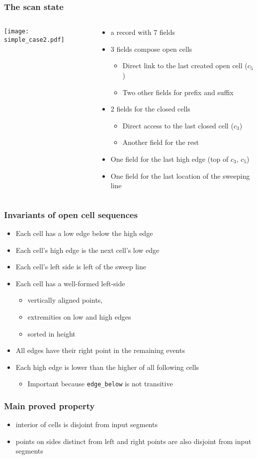 \documentclass[compress]{beamer}
\begin{document}
\begin{frame}[fragile]
\frametitle{The scan state}
\begin{columns}
\begin{column}{0.2\textwidth}
{\texttt{[image: simple\_case2.pdf]}}
\end{column}
\begin{column}{0.8\textwidth}
\begin{itemize}
\item a record with 7 fields
\item 3 fields compose open cells
\begin{itemize}
\item Direct link to the last created open cell (\(c_5\))
\item Two other fields for prefix and suffix 
\end{itemize}
\item 2 fields for the closed cells
\begin{itemize}
\item Direct access to the last closed cell (\(c_3\))
\item Another field for the rest
\end{itemize}
\item One field for the last high edge (top of \(c_3\), \(c_5\))
\item One field for the last location of the sweeping line
\end{itemize}
\end{column}
\end{columns}
\end{frame}
\begin{frame}
\frametitle{Invariants of open cell sequences}
\begin{itemize}
\item Each cell has a low edge below the high edge
\item Each cell's high edge is the next cell's low edge
\item Each cell's left side is left of the sweep line
\item Each cell has a well-formed left-side
\begin{itemize}
\item vertically aligned points,
\item extremities on low and high edges
\item sorted in height
\end{itemize}
\item All edges have their right point in the remaining events
\item Each high edge is lower than the higher of all following cells
\begin{itemize}
\item Important because {\tt edge\_below} is not transitive
\end{itemize}
\end{itemize}
\end{frame}
\begin{frame}
\frametitle{Main proved property}
\begin{itemize}
\item interior of cells is disjoint from input segments
\item points on sides distinct from left and right points are also disjoint from
 input segments
\end{itemize}
\end{frame}
\end{document}
